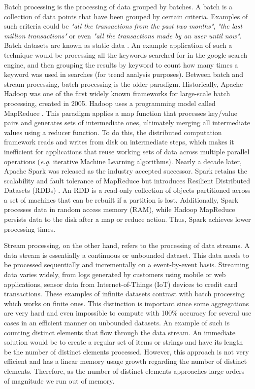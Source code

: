 Batch processing is the processing of data grouped by batches. A batch is a collection of data points that have been grouped by certain criteria. Examples of such criteria could be \textit{"all the transactions from the past two months"}, \textit{"the last million transactions"} or even \textit{"all the transactions made by an user until now"}. Batch datasets are known as static data \cite{Martin-Batch-Defin}. An example application of such a technique would be processing all the keywords searched for in the google search engine, and then grouping the results by keyword to count how many times a keyword was used in searches (for trend analysis purposes). Between batch and stream processing, batch processing is the older paradigm. Historically, Apache Hadoop \cite{borthakur2007hadoop, Hadoop, ApacheHadoop} was one of the first widely known frameworks for large-scale batch processing, created in 2005. Hadoop uses a programming model called MapReduce \cite{MapReduce}. This paradigm applies a map function that processes key/value pairs and generates sets of intermediate ones, ultimately merging all intermediate values
using a reducer function. To do this, the distributed computation framework reads and writes from disk on intermediate steps, which makes it inefficient for applications that reuse working sets of data across multiple parallel operations (\textit{e.g.} iterative Machine Learning algorithms). Nearly a decade later, Apache Spark \cite{ApacheSpark, Spark} was released as the industry accepted successor.
Spark retains the scalability and fault tolerance of MapReduce but introduces Resilient Distributed Datasets (RDDs) \cite{SparkRDDs}. An RDD is a read-only collection of objects partitioned across a set of machines that can be rebuilt if a partition is lost.
Additionally, Spark processes data in random access memory (RAM), while Hadoop MapReduce persists data to the disk after a map or reduce action. Thus, Spark achieves lower processing times. 

Stream processing, on the other hand, refers to the processing of data streams. A data stream is essentially a continuous or unbounded dataset. This data needs to be processed sequentially and incrementally on a event-by-event basis. Streaming data varies widely, from logs generated by customers using mobile or web applications, sensor data from Internet-of-Things (IoT) devices to credit card transactions. These examples of infinite datasets contrast with batch processing which works on finite ones. This distinction is important since some aggregations are very hard and even impossible to compute with 100\% accuracy for several use cases in an efficient manner on unbounded datasets. An example of such is counting distinct elements that flow through the data stream. An immediate solution would be to create a regular set of items or strings and have its length be the number of distinct elements processed. However, this approach is not very efficient and has a linear memory usage growth regarding the number of distinct elements. Therefore, as the number of distinct elements approaches large orders of magnitude we run out of memory.


